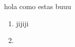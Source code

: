 \documentclass[12pt]{article}
\begin{document}
hola como estas buuu
\begin{enumerate}
    \item jijiji
    \item 
\end{enumerate}
\end{document}
